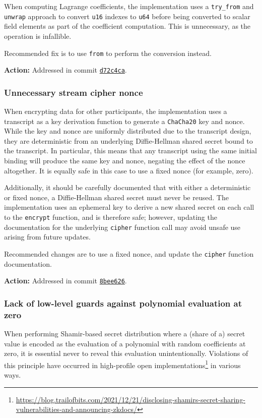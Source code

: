 \documentclass{article}
\begin{document}
When computing Lagrange coefficients, the implementation uses a \texttt{try\_from} and \texttt{unwrap} approach to convert \texttt{u16} indexes to \texttt{u64} before being converted to scalar field elements as part of the coefficient computation.
This is unnecessary, as the operation is infallible.

Recommended fix is to use \texttt{from} to perform the conversion instead.

\textbf{Action:} Addressed in commit \href{https://github.com/serai-dex/serai/commit/d72c4ca4f764d4aed745e75b5c1a93ad120fd880}{\texttt{d72c4ca}}.


\subsubsection{Unnecessary stream cipher nonce}

When encrypting data for other participants, the implementation uses a transcript as a key derivation function to generate a \texttt{ChaCha20} key and nonce.
While the key and nonce are uniformly distributed due to the transcript design, they are deterministic from an underlying Diffie-Hellman shared secret bound to the transcript.
In particular, this means that any transcript using the same initial binding will produce the same key and nonce, negating the effect of the nonce altogether.
It is equally safe in this case to use a fixed nonce (for example, zero).

Additionally, it should be carefully documented that with either a deterministic or fixed nonce, a Diffie-Hellman shared secret must never be reused.
The implementation uses an ephemeral key to derive a new shared secret on each call to the \texttt{encrypt} function, and is therefore safe; however, updating the documentation for the underlying \texttt{cipher} function call may avoid unsafe use arising from future updates.

Recommended changes are to use a fixed nonce, and update the \texttt{cipher} function documentation.

\textbf{Action:} Addressed in commit \href{https://github.com/serai-dex/serai/commit/8bee62609caf6d127aed6a0f338c57f7b473f2f9}{\texttt{8bee626}}.


\subsubsection{Lack of low-level guards against polynomial evaluation at zero}

When performing Shamir-based secret distribution where a (share of a) secret value is encoded as the evaluation of a polynomial with random coefficients at zero, it is essential never to reveal this evaluation unintentionally.
Violations of this principle have occurred in high-profile open implementations\footnote{\url{https://blog.trailofbits.com/2021/12/21/disclosing-shamirs-secret-sharing-vulnerabilities-and-announcing-zkdocs/}} in various ways.
\end{document}

